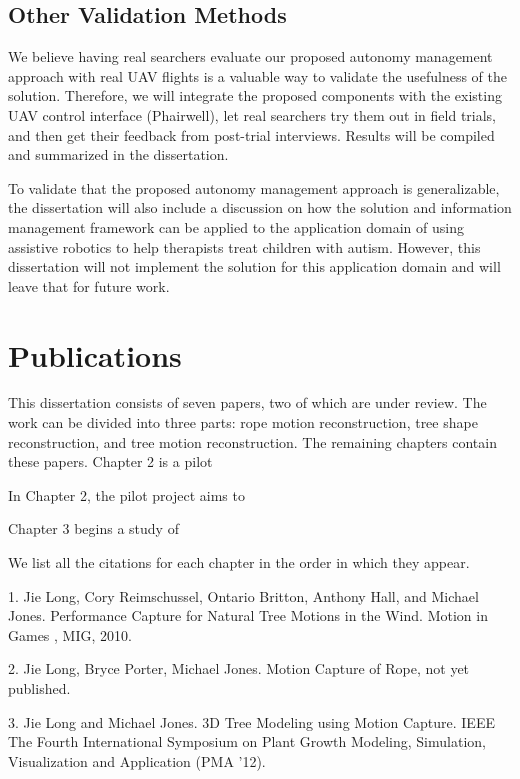 \subsection{Other Validation Methods}

We believe having real searchers evaluate our proposed autonomy management approach with real UAV flights is a valuable way to validate the usefulness of the solution. Therefore, we will integrate the proposed components with the existing UAV control interface (Phairwell), let real searchers try them out in field trials, and then get their feedback from post-trial interviews. Results will be compiled and summarized in the dissertation.

To validate that the proposed autonomy management approach is generalizable, the dissertation will also include a discussion on how the solution and information management framework can be applied to the application domain of using assistive robotics to help therapists treat children with autism. However, this dissertation will not implement the solution for this application domain and will leave that for future work.



\section{Publications}
This dissertation consists of seven papers, two of which are under review.  The work can be divided into three parts: rope motion reconstruction, tree shape reconstruction, and tree motion reconstruction. The remaining chapters contain these papers.  Chapter 2 is a pilot 

In Chapter 2, the pilot project aims to 

Chapter 3 begins a study of 


We list all the citations for each chapter in the order in which they appear.

1. Jie Long, Cory Reimschussel, Ontario Britton, Anthony Hall, and Michael Jones. Performance Capture for Natural Tree Motions in the Wind. Motion in Games , MIG, 2010. 

2. Jie Long, Bryce Porter, Michael Jones. Motion Capture of Rope, not yet published.

3. Jie Long and Michael Jones. 3D Tree Modeling using Motion Capture. IEEE The Fourth International Symposium on Plant Growth Modeling, Simulation, Visualization and Application (PMA '12).

